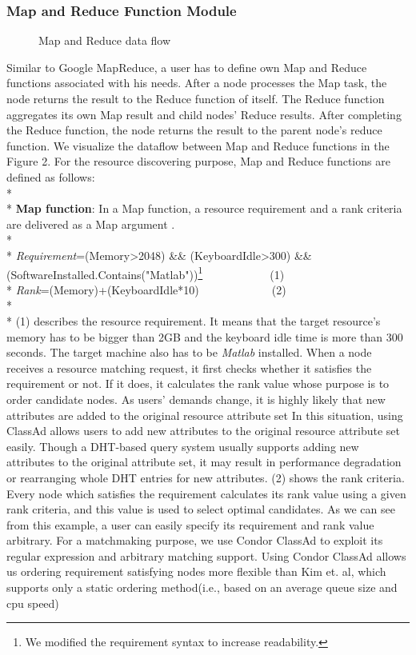 \documentclass{acm_proc_article-sp}
\begin{document}
\subsubsection{Map and Reduce Function Module}
\begin{figure}
\centering
{}
\caption{Map and Reduce data flow}
\end{figure}
Similar to Google MapReduce, a user has to define own Map and Reduce functions associated with his needs. 
After a node processes the Map task, the node returns the result to the Reduce function of itself.
The Reduce function aggregates its own Map result and child nodes' Reduce results. 
After completing the Reduce function, the node returns the result to the parent node's reduce function.
We visualize the dataflow between Map and Reduce functions in the Figure 2.
For the resource discovering purpose, Map and Reduce functions are defined as follows:\\*\\*
\textbf{Map function}: In a Map function, a resource requirement and a rank criteria are delivered as a Map argument .\\*\\*
\textit{Requirement}=(Memory>2048) \&\& (KeyboardIdle>300) \&\& (SoftwareInstalled.Contains("Matlab"))\footnote{We modified the requirement syntax to increase readability.}\ \ \ \ \ \ \ \ \ \ \ \ (1)\\*
\textit{Rank}=(Memory)+(KeyboardIdle*10)\ \ \ \ \ \ \ \ \ \ \ \ \ (2)\\*\\*
(1) describes the resource requirement. It means that the target resource's memory has to be bigger than 2GB and the keyboard idle time is more than 300 seconds.
The target machine also has to be \textit{Matlab} installed.
When a node receives a resource matching request, it first checks whether it satisfies the requirement or not. If it does, it calculates the rank value whose purpose is to order candidate nodes.
As users' demands change, it is highly likely that new attributes are added to the original resource attribute set 
In this situation, using ClassAd allows users to add new attributes to the original resource attribute set easily.
Though a DHT-based query system usually supports adding new attributes to the original attribute set, it may result in performance degradation or rearranging whole DHT entries for new attributes.
(2) shows the rank criteria. Every node which satisfies the requirement calculates its rank value using a given rank criteria, and this value is used to select optimal candidates.
As we can see from this example, a user can easily specify its requirement and rank value arbitrary.
For a matchmaking purpose, we use Condor ClassAd\cite{classad} to exploit its regular expression and arbitrary matching support.
Using Condor ClassAd allows us ordering requirement satisfying nodes more flexible than Kim et. al\cite{can_query}, which supports only a static ordering method(i.e., based on an average queue size and cpu speed)
\end{document}
